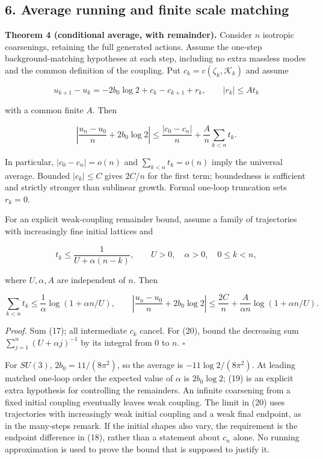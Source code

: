 \documentclass[11pt,a4paper]{article}
\begin{document}
\hypertarget{average-running-and-finite-scale-matching}{%
\subsection{6. Average running and finite scale
matching}\label{average-running-and-finite-scale-matching}}

\textbf{Theorem 4 (conditional average, with remainder).} Consider \(n\)
isotropic coarsenings, retaining the full generated actions. Assume the
one-step background-matching hypotheses at each step, including no extra
massless modes and the common definition of the coupling. Put
\(c_k=c(\zeta_k,\mathcal K_k)\) and assume

\[u_{k+1}-u_k=-2b_0\log2+c_k-c_{k+1}+r_k,
 \qquad |r_k|\le A t_k \tag{17}\]

with a common finite \(A\). Then

\[\left|\frac{u_n-u_0}{n}+2b_0\log2\right|
 \le\frac{|c_0-c_n|}{n}+\frac A n\sum_{k<n}t_k. \tag{18}\]

In particular, \(|c_0-c_n|=o(n)\) and \(\sum_{k<n}t_k=o(n)\) imply the
universal average. Bounded \(|c_k|\le C\) gives \(2C/n\) for the first
term; boundedness is sufficient and strictly stronger than sublinear
growth. Formal one-loop truncation sets \(r_k=0\).

For an explicit weak-coupling remainder bound, assume a family of
trajectories with increasingly fine initial lattices and

\[t_k\le\frac1{U+\alpha(n-k)},\qquad
 U>0,\quad\alpha>0,\quad 0\le k<n, \tag{19}\]

where \(U,\alpha,A\) are independent of \(n\). Then

\[\sum_{k<n}t_k\le\frac1\alpha\log(1+\alpha n/U),\qquad
 \left|\frac{u_n-u_0}{n}+2b_0\log2\right|
 \le\frac{2C}{n}+\frac A{\alpha n}\log(1+\alpha n/U). \tag{20}\]

\emph{Proof.} Sum (17); all intermediate \(c_k\) cancel. For (20), bound
the decreasing sum \(\sum_{j=1}^n(U+\alpha j)^{-1}\) by its integral
from 0 to \(n\). \(\square\)

For \(SU(3)\), \(2b_0=11/(8\pi^2)\), so the average is
\(-11\log2/(8\pi^2)\). At leading matched one-loop order the expected
value of \(\alpha\) is \(2b_0\log2\); (19) is an explicit extra
hypothesis for controlling the remainders. An infinite coarsening from a
fixed initial coupling eventually leaves weak coupling. The limit in
(20) uses trajectories with increasingly weak initial coupling and a
weak final endpoint, as in the many-steps remark. If the initial shapes
also vary, the requirement is the endpoint difference in (18), rather
than a statement about \(c_n\) alone. No running approximation is used
to prove the bound that is supposed to justify it.
\end{document}
